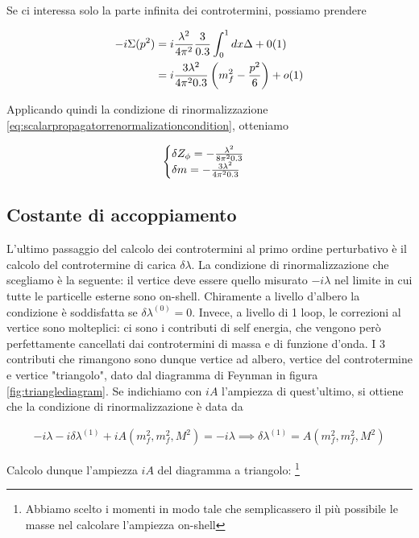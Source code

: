 \documentclass[11pt]{report}
\begin{document}
Se ci interessa solo la parte infinita dei controtermini, possiamo prendere 

\begin{align}
    -i\Sigma(p^2) &= i\frac{\lambda^2}{4\pi^2}\frac{3}{0.3}\int_0^1 dx \Delta + 0(1) \notag \\ 
    &= i\frac{3\lambda^2}{4\pi^20.3}\left(m_f^2 - \frac{p^2}{6}\right) + o(1)
\end{align}

Applicando quindi la condizione di rinormalizzazione \ref{eq:scalarpropagatorrenormalizationcondition}, otteniamo 

\begin{align}
    \begin{cases}
        \delta Z_\phi = -\frac{\lambda^2}{8\pi^20.3} \\
        \delta m = -\frac{3\lambda^2}{4\pi^20.3}
    \end{cases}
\end{align}

\subsection{Costante di accoppiamento}

L'ultimo passaggio del calcolo dei controtermini al primo ordine perturbativo è il calcolo del controtermine di carica \(\delta \lambda\). La condizione di rinormalizzazione che scegliamo è la seguente: il vertice deve essere quello misurato \(-i\lambda\) nel limite in cui tutte le particelle esterne sono on-shell. Chiramente a livello d'albero la condizione è soddisfatta se \(\delta \lambda^{(0)} = 0\). Invece, a livello di 1 loop, le correzioni al vertice sono molteplici: ci sono i contributi di self energia, che vengono però perfettamente cancellati dai controtermini di massa e di funzione d'onda. I 3 contributi che rimangono sono dunque vertice ad albero, vertice del controtermine e vertice "triangolo", dato dal diagramma di Feynman in figura \ref{fig:trianglediagram}. Se indichiamo con \(iA\) l'ampiezza di quest'ultimo, si ottiene che la condizione di rinormalizzazione è data da 

\begin{align}
    -i\lambda -i\delta \lambda^{(1)} +iA(m_f^2, m_f^2, M^2) = -i\lambda \implies \delta \lambda^{(1)} = A(m_f^2, m_f^2, M^2)
\end{align}

Calcolo dunque l'ampiezza \(iA\) del diagramma a triangolo: \footnote{Abbiamo scelto i momenti in modo tale che semplicassero il più possibile le masse nel calcolare l'ampiezza on-shell}
\end{document}
